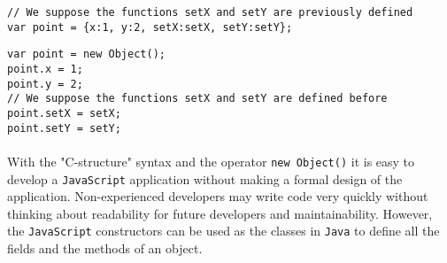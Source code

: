 \begin{lstlisting}[caption=Creating an object with the "C-structure" syntax, label={way2}]
// We suppose the functions setX and setY are previously defined
var point = {x:1, y:2, setX:setX, setY:setY};
\end{lstlisting}

\begin{lstlisting}[caption=Creating an object with the operator "new Object()", label={way3}]
var point = new Object();
point.x = 1;
point.y = 2;
// We suppose the functions setX and setY are defined before
point.setX = setX;
point.setY = setY;
\end{lstlisting}



\paragraph{}
With the "C-structure" syntax and the operator \texttt{new Object()} it is easy to develop a \texttt{JavaScript} application without making a formal design of the application. Non-experienced developers may write code very quickly without thinking about readability for future developers and maintainability. However, the \texttt{JavaScript} constructors can be used as the classes in \texttt{Java} to define all the fields and the methods of an object.


